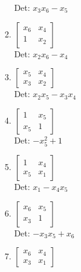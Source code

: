 \documentclass[12pt]{article}
\begin{document}
\begin{enumerate}
\begin{enumerate}
\begin{enumerate}
Det: $x_{3} x_{6} - x_{5}$\\


\item $\displaystyle \left[\begin{matrix}x_{6} & x_{4}\\1 & x_{2}\end{matrix}\right]$\\

Det: $x_{2} x_{6} - x_{4}$\\


\item $\displaystyle \left[\begin{matrix}x_{5} & x_{4}\\x_{3} & x_{2}\end{matrix}\right]$\\

Det: $x_{2} x_{5} - x_{3} x_{4}$\\


\item $\displaystyle \left[\begin{matrix}1 & x_{5}\\x_{5} & 1\end{matrix}\right]$\\

Det: $- x_{5}^{2} + 1$\\


\item $\displaystyle \left[\begin{matrix}1 & x_{4}\\x_{5} & x_{1}\end{matrix}\right]$\\

Det: $x_{1} - x_{4} x_{5}$\\


\item $\displaystyle \left[\begin{matrix}x_{6} & x_{5}\\x_{3} & 1\end{matrix}\right]$\\

Det: $- x_{3} x_{5} + x_{6}$\\


\item $\displaystyle \left[\begin{matrix}x_{6} & x_{4}\\x_{3} & x_{1}\end{matrix}\right]$\\


\end{enumerate}
\end{enumerate}
\end{enumerate}
\end{document}
